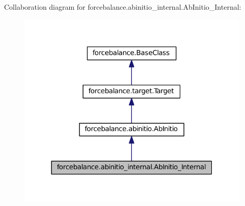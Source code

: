 \-Collaboration diagram for forcebalance.\-abinitio\-\_\-internal.\-Ab\-Initio\-\_\-\-Internal\-:\nopagebreak
\begin{figure}[H]
\begin{center}
\leavevmode
\includegraphics[width=316pt]{classforcebalance_1_1abinitio__internal_1_1AbInitio__Internal__coll__graph}
\end{center}
\end{figure}
